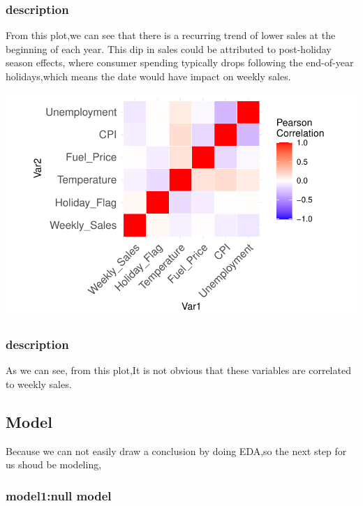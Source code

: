 \documentclass[
  letterpaper,
  DIV=11,
  numbers=noendperiod]{scrartcl}
\begin{document}
\hypertarget{description-3}{%
\subsubsection{description}\label{description-3}}

From this plot,we can see that there is a recurring trend of lower sales
at the beginning of each year. This dip in sales could be attributed to
post-holiday season effects, where consumer spending typically drops
following the end-of-year holidays,which means the date would have
impact on weekly sales.

\includegraphics{678final_files/figure-pdf/matrix-plot-1.pdf}

\hypertarget{description-4}{%
\subsubsection{description}\label{description-4}}

As we can see, from this plot,It is not obvious that these variables are
correlated to weekly sales.

\hypertarget{model}{%
\subsection{Model}\label{model}}

Because we can not easily draw a conclusion by doing EDA,so the next
step for us shoud be modeling,

\hypertarget{model1null-model}{%
\subsubsection{model1:null model}\label{model1null-model}}
\end{document}
